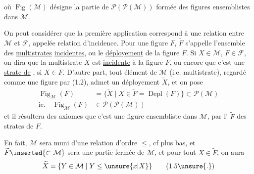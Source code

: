 où $\operatorname{Fig}(\mathcal{M})$ désigne la partie de $\mathcal{P}(\mathcal{P}(\mathcal{M}))$ formée des figures ensemblistes dans $\mathcal{M}$. 

On peut considérer que la première application correspond à une relation entre $\mathcal{M}$ et $\mathcal{F}$, appelée relation d'incidence. Pour une figure $F$, $\widetilde F$ s'appelle l'ensemble des \uline{multistrates} \uline{incidentes}, ou le \uline{déployement} de la figure $F$. Si $X\in\mathcal{M}$, $F\in\mathcal{F}$, on dira que la multistrate $X$ est \uline{incidente} à la figure $F$, ou encore que c'est une \uline{strate de} , si $X\in\widetilde F$. D'autre part, tout élément  de $\mathcal{M}$ (i.e.  multistrate), regardé comme une figure par (1.2), admet un déployement $\widetilde X$, et    on pose
\margin{$\unsure{\bullet|\cdot}$}
\[
\begin{aligned}
\operatorname{Fig}_{\mathcal{M}}(F)&=\{\widetilde X\mid X\in\widetilde F=\operatorname{Depl}(F)\}\subset\mathcal{P}(\mathcal{M})\\
\text{ie.}\quad \operatorname{Fig}_{\mathcal{M}}(F)&\in\mathcal{P}(\mathcal{P}(\mathcal{M}))
\end{aligned}\tag*{(1.4)}
\]
et il résultera des axiomes que c'est une figure ensembliste dans $\mathcal{M}$,   par l' $\widetilde F$ des strates de $F$.

  En fait, $\mathcal{M}$ sera muni d'une relation d'ordre $\leq$, cf plus bas, et $\widetilde F\inserted{\subset\mathcal{M}}$ sera une partie fermée de  $\mathcal{M}$, et pour tout $X\in\widetilde F$,  on aura
\[
\widetilde X=\{Y\in\mathcal{M}\mid Y\leq\unsure{x|X}\}\tag*{(1.5\unsure{.})}
\]
